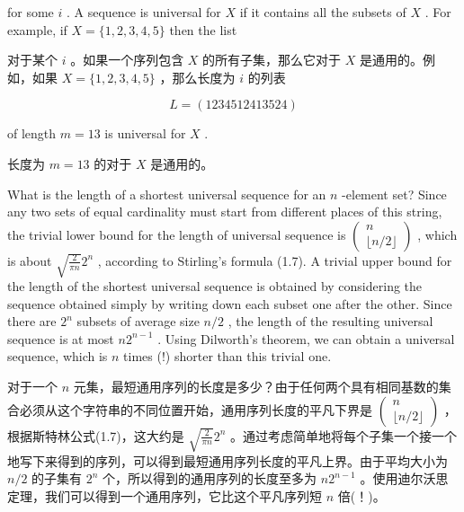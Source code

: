 \documentclass[10pt]{article}
\begin{document}
for some \(i\) . A sequence is universal for \(X\) if it contains all the subsets of \(X\) . For example, if \(X = \{ 1,2,3,4,5\}\) then the list

\begin{tcolorbox}\relax
对于某个 \(i\) 。如果一个序列包含 \(X\) 的所有子集，那么它对于 \(X\) 是通用的。例如，如果 \(X = \{ 1,2,3,4,5\}\) ，那么长度为 \(i\) 的列表
\end{tcolorbox}

\[
L = \left( {1234512413524}\right)
\]

of length \(m = {13}\) is universal for \(X\) .

\begin{tcolorbox}\relax
长度为 \(m = {13}\) 的对于 \(X\) 是通用的。
\end{tcolorbox}

What is the length of a shortest universal sequence for an \(n\) -element set? Since any two sets of equal cardinality must start from different places of this string, the trivial lower bound for the length of universal sequence is \(\left( \begin{matrix} n \\  \lfloor n/2\rfloor  \end{matrix}\right)\) , which is about \(\sqrt{\frac{2}{\pi n}}{2}^{n}\) , according to Stirling’s formula (1.7). A trivial upper bound for the length of the shortest universal sequence is obtained by considering the sequence obtained simply by writing down each subset one after the other. Since there are \({2}^{n}\) subsets of average size \(n/2\) , the length of the resulting universal sequence is at most \(n{2}^{n - 1}\) . Using Dilworth’s theorem, we can obtain a universal sequence, which is \(n\) times (!) shorter than this trivial one.

\begin{tcolorbox}\relax
对于一个 \(n\) 元集，最短通用序列的长度是多少？由于任何两个具有相同基数的集合必须从这个字符串的不同位置开始，通用序列长度的平凡下界是 \(\left( \begin{matrix} n \\  \lfloor n/2\rfloor  \end{matrix}\right)\) ，根据斯特林公式(1.7)，这大约是 \(\sqrt{\frac{2}{\pi n}}{2}^{n}\) 。通过考虑简单地将每个子集一个接一个地写下来得到的序列，可以得到最短通用序列长度的平凡上界。由于平均大小为 \(n/2\) 的子集有 \({2}^{n}\) 个，所以得到的通用序列的长度至多为 \(n{2}^{n - 1}\) 。使用迪尔沃思定理，我们可以得到一个通用序列，它比这个平凡序列短 \(n\) 倍(！)。
\end{tcolorbox}
\end{document}
